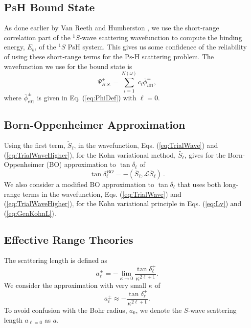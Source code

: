 \documentclass[preprint,showpacs,showkeys,preprintnumbers,amsmath,amssymb,longbibliography,pra,aps]{revtex4-1}
\begin{document}
{\subsection{PsH Bound State}
As done earlier by Van Reeth and Humberston \cite{VanReeth2003,VanReeth2004},
we use the short-range correlation part of the $^1S$-wave scattering wavefunction
to compute the binding energy, $E_b$, of the $^1S$ PsH system. This gives us
some confidence of the reliability of using these short-range terms for the Ps-H 
scattering problem. The wavefunction we use for the bound state is
\begin{equation}
\label{eq:BoundWavefn}
\Psi_{B.S.}^\pm = \sum_{i=1}^{N(\omega)} c_i \bar{\phi}_{i01}^\pm,
\end{equation}
where $\bar{\phi}_{i01}^\pm$ is given in Eq. (\ref{eq:PhiDef}) with
$\ell = 0$.

\subsection{Born-Oppenheimer Approximation}
Using the first term, $\widetilde{S}_\ell$, in the wavefunction,
Eqs. (\ref{eq:TrialWave}) and (\ref{eq:TrialWaveHigher}), for
the Kohn variational method, $\bar S_\ell$, gives for the
Born-Oppenheimer (BO) approximation to $\tan\delta_\ell$ of
\begin{equation}
\label{eq:Born}
\tan\delta_\ell^{BO} = -(\bar{S}_\ell,\mathcal{L}\bar{S}_\ell)\,.
\end{equation}
We also consider a modified BO approximation to $\tan\delta_\ell$ that uses
both long-range terms in the wavefunction,
Eqs. (\ref{eq:TrialWave}) and (\ref{eq:TrialWaveHigher}), for the Kohn
variational principle in Eqs. (\ref{eq:Lv}) and (\ref{eq:GenKohnL}).


\subsection{Effective Range Theories}

The scattering length is defined as \cite{Bransden2003}
\begin{equation}
\label{eq:ScatLen}
a_\ell^\pm = -\lim_{\kappa \to 0}
  \frac{\tan{\delta_\ell^\pm}}{\kappa^{2\ell+1}}.
\end{equation}
We consider the approximation with very small $\kappa$ of
\begin{equation}
\label{eq:ScatLenApprox}
a_\ell^\pm \approx
  - \frac{\tan{\delta_\ell^\pm}}{\kappa^{2\ell+1}}.
\end{equation}
To avoid confusion with the Bohr radius, $a_0$, we denote
the $S$-wave scattering length $a_{\ell=0}$ as $a$.

}
\end{document}
